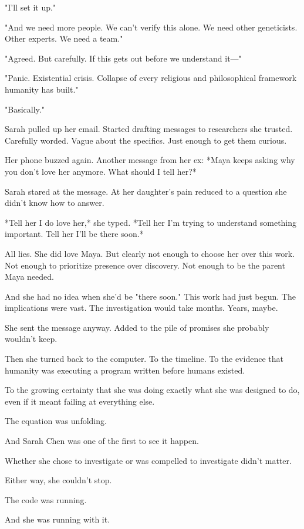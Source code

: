 "I'll set it up."

"And we need more people. We can't verify this alone. We need other geneticists. Other experts. We need a team."

"Agreed. But carefully. If this gets out before we understand it—"

"Panic. Existential crisis. Collapse of every religious and philosophical framework humanity has built."

"Basically."

Sarah pulled up her email. Started drafting messages to researchers she trusted. Carefully worded. Vague about the specifics. Just enough to get them curious.

Her phone buzzed again. Another message from her ex: *Maya keeps asking why you don't love her anymore. What should I tell her?*

Sarah stared at the message. At her daughter's pain reduced to a question she didn't know how to answer.

*Tell her I do love her,* she typed. *Tell her I'm trying to understand something important. Tell her I'll be there soon.*

All lies. She did love Maya. But clearly not enough to choose her over this work. Not enough to prioritize presence over discovery. Not enough to be the parent Maya needed.

And she had no idea when she'd be "there soon." This work had just begun. The implications were vast. The investigation would take months. Years, maybe.

She sent the message anyway. Added to the pile of promises she probably wouldn't keep.

Then she turned back to the computer. To the timeline. To the evidence that humanity was executing a program written before humans existed.

To the growing certainty that she was doing exactly what she was designed to do, even if it meant failing at everything else.

The equation was unfolding.

And Sarah Chen was one of the first to see it happen.

Whether she chose to investigate or was compelled to investigate didn't matter.

Either way, she couldn't stop.

The code was running.

And she was running with it.

